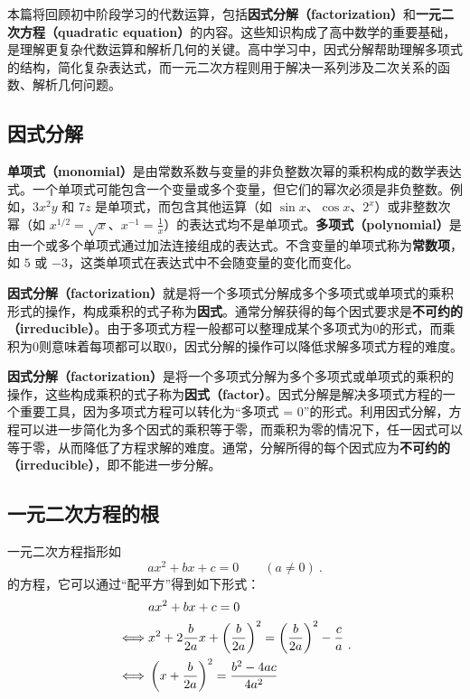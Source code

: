 
本篇将回顾初中阶段学习的代数运算，包括\textbf{因式分解（factorization）}和\textbf{一元二次方程（quadratic equation）}的内容。这些知识构成了高中数学的重要基础，是理解更复杂代数运算和解析几何的关键。高中学习中，因式分解帮助理解多项式的结构，简化复杂表达式，而一元二次方程则用于解决一系列涉及二次关系的函数、解析几何问题。

\subsection{因式分解}

\textbf{单项式（monomial）}是由常数系数与变量的非负整数次幂的乘积构成的数学表达式。一个单项式可能包含一个变量或多个变量，但它们的幂次必须是非负整数。例如，$3x^2y$ 和 $7z$ 是单项式，而包含其他运算（如 $\sin x$、$\cos x$、$2^x$）或非整数次幂（如 $\displaystyle x^{1/2} = \sqrt{x}$、$\displaystyle x^{-1} = \frac{1}{x}$）的表达式均不是单项式。\textbf{多项式（polynomial）}是由一个或多个单项式通过加法连接组成的表达式。不含变量的单项式称为\textbf{常数项}，如 $5$ 或 $-3$，这类单项式在表达式中不会随变量的变化而变化。

\textbf{因式分解（factorization）}就是将一个多项式分解成多个多项式或单项式的乘积形式的操作，构成乘积的式子称为\textbf{因式}。通常分解获得的每个因式要求是\textbf{不可约的（irreducible）}。由于多项式方程一般都可以整理成某个多项式为$0$的形式，而乘积为$0$则意味着每项都可以取$0$，因式分解的操作可以降低求解多项式方程的难度。

\textbf{因式分解（factorization）}是将一个多项式分解为多个多项式或单项式的乘积的操作，这些构成乘积的式子称为\textbf{因式（factor）}。因式分解是解决多项式方程的一个重要工具，因为多项式方程可以转化为“多项式 = 0”的形式。利用因式分解，方程可以进一步简化为多个因式的乘积等于零，而乘积为零的情况下，任一因式可以等于零，从而降低了方程求解的难度。通常，分解所得的每个因式应为\textbf{不可约的（irreducible）}，即不能进一步分解。



\subsection{一元二次方程的根}

一元二次方程指形如
\begin{equation}
ax^2+bx+c=0 \qquad (a\neq 0)~.
\end{equation}
的方程，它可以通过“配平方”得到如下形式：
\begin{equation}\label{eq_quasol_3}
\begin{split}
 & ax^2+bx+c = 0 \\ 
\iff&x^2+2{b\over 2a} x+\left({b\over 2a}\right)^2 = \left({b\over 2a}\right)^2-{c\over a} \\ 
\iff&\left(x+{b\over 2a}\right)^2 = {b^2-4ac\over 4a^2} \\ 
\end{split}~.
\end{equation}

